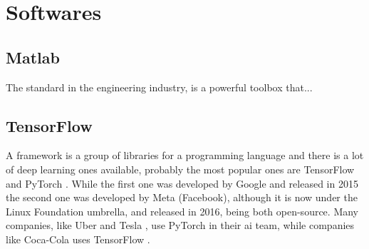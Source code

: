 \section{Softwares}

\subsection{Matlab}

The standard in the engineering industry, \matlab is a powerful toolbox that...

\subsection{TensorFlow}

A framework is a group of libraries for a programming language and there is a lot of deep learning ones available, probably the most popular ones are TensorFlow \citep{abadi2016} and PyTorch \citep{paszke2019}. 
While the first one was developed by Google and released in 2015 the second one was developed by Meta (Facebook), although it is now under the Linux Foundation umbrella, and released in 2016, being both open-source.
Many companies, like Uber \citep{goodman2017} and Tesla \citep{pytorch2019}, use PyTorch in their \gls*{ai} team, while companies like Coca-Cola uses TensorFlow \citep{tensorflow2018}.



